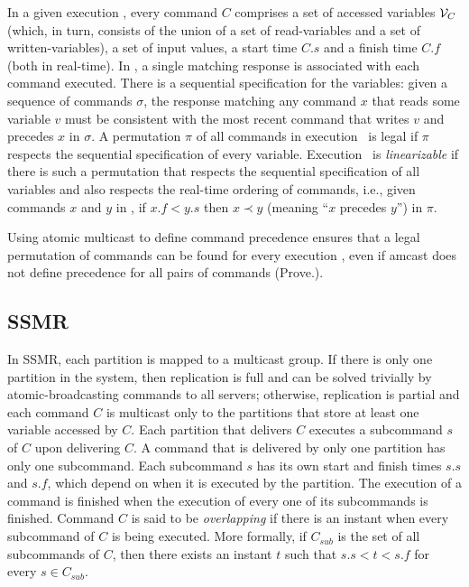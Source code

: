 \documentclass{usiinftr}
\begin{document}
In a given execution \ex, every command $C$ comprises a set of accessed variables $\mathcal{V}_C$ (which, in turn, consists of the union of a set of read-variables and a set of written-variables), a set of input values, a start time $C.s$ and a finish time $C.f$ (both in real-time).
In \ex, a single matching response is associated with each command executed. There is a sequential specification for the variables: given a sequence of commands $\sigma$, the response matching any command $x$ that reads some variable $v$ must be consistent with the most recent command that writes $v$ and precedes $x$ in $\sigma$. A permutation $\pi$ of all commands in execution \ex\ is legal if $\pi$ respects the sequential specification of every variable. Execution \ex\ is \emph{linearizable} if there is such a permutation that respects the sequential specification of all variables and also respects the real-time ordering of commands, i.e., given commands $x$ and $y$ in \ex, if $x.f < y.s$ then $x \prec y$ (meaning ``$x$ precedes $y$'') in $\pi$.

Using atomic multicast to define command precedence ensures that a legal permutation of commands can be found for every execution \ex, even if amcast does not define precedence for all pairs of commands (Prove.).

\subsection{SSMR}

In SSMR, each partition is mapped to a multicast group. If there is only one partition in the system, then replication is full and can be solved trivially by atomic-broadcasting commands to all servers; otherwise, replication is partial and each command $C$ is multicast only to the partitions that store at least one variable accessed by $C$. Each partition that delivers $C$ executes a subcommand $s$ of $C$ upon delivering $C$. A command that is delivered by only one partition has only one subcommand. Each subcommand $s$ has its own start and finish times $s.s$ and $s.f$, which depend on when it is executed by the partition. The execution of a command is finished when the execution of every one of its subcommands is finished.
%
%
Command $C$ is said to be \emph{overlapping} if there is an instant when every subcommand of $C$ is being executed. More formally, if $C_{sub}$ is the set of all subcommands of $C$, then there exists an instant $t$ such that $s.s < t < s.f$ for every $s \in C_{sub}$.
\end{document}
